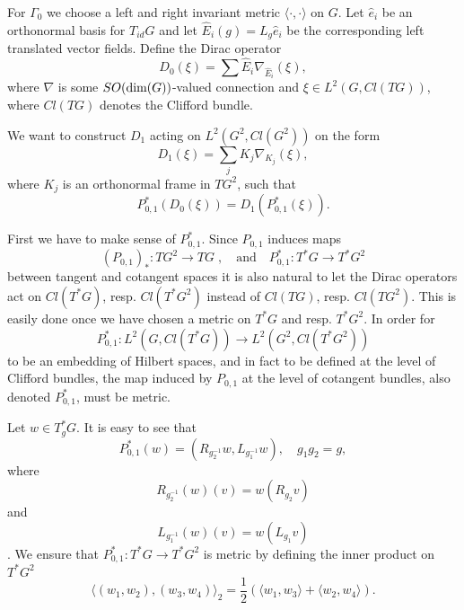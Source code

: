\documentclass[12pt]{article}
\begin{document}
{For $\Gamma_0$ we choose a left and right invariant metric $\langle \cdot ,\cdot \rangle$ on $G$. Let $\hat{e}_i$ be an orthonormal basis for $T_{id}G$ and let $\hat{E}_i(g)=L_g\hat{e}_i$ be the corresponding left translated vector fields. Define the Dirac operator 
$$D_0(\xi) =\sum \hat{E}_i\nabla_{\hat{E}_i} (\xi),$$
where $\nabla$ is some $SO(\hbox{dim}(G))$-valued connection and $\xi \in L^2(G,Cl(TG))$, where $Cl(TG)$ denotes the Clifford bundle.

We want to construct $D_1$ acting on $L^2(G^2,Cl(G^2))$ on the form 
$$D_1(\xi) =\sum_{j} K_j \nabla_{K_j} (\xi), $$
where $K_j$ is an orthonormal frame in $TG^2$, such that $$P^*_{0,1} (D_0(\xi))=D_1(P_{0,1}^* (\xi)).$$ 

First we have to make sense of $P^*_{0,1}$. 
Since $P_{0,1}$ induces maps 
\[
(P_{0,1})_*:TG^2\rightarrow TG\;,\quad \mbox{and} \quad P_{0,1}^*:T^*G\rightarrow T^*G^2
\]
between tangent and cotangent spaces it is also natural to let the Dirac operators act on $Cl(T^*G)$, resp. $Cl(T^*G^2)$ instead of $Cl(TG)$, resp. $Cl(TG^2)$. This is easily done once we have chosen a metric on $T^*G$ and resp. $T^*G^2$. In order for 
$$P_{0,1}^* :L^2(G, Cl(T^*G)) \to L^2(G^2 ,Cl(T^*G^2))$$
to be an embedding of Hilbert spaces, and in fact to be defined at the level of Clifford bundles, the map induced by $P_{0,1}$ at the level of cotangent bundles, also denoted $P^*_{0,1}$, must be metric. 

Let $w \in T^*_gG$. It is easy to see that 
$$P^*_{0,1}(w )=(R_{g_2^{-1}} w , L_{g_1^{-1}}w ), \quad g_1g_2=g,$$
where 
$$R_{g_2^{-1}}(w)(v)=w (R_{g_2}v)$$ 
and 
$$L_{g_1^{-1}}(w )(v)=w(L_{g_1}v)$$. 
We ensure that $P_{0,1}^* :T^*G\to T^*G^2$ is metric by defining the inner product on $T^*G^2$ 
$$\langle (w_1,w_2),(w_3,w_4)\rangle_2 =\frac{1}{2}(\langle w_1,w_3\rangle +\langle w_2,w_4 \rangle ).$$
 

}
\end{document}
